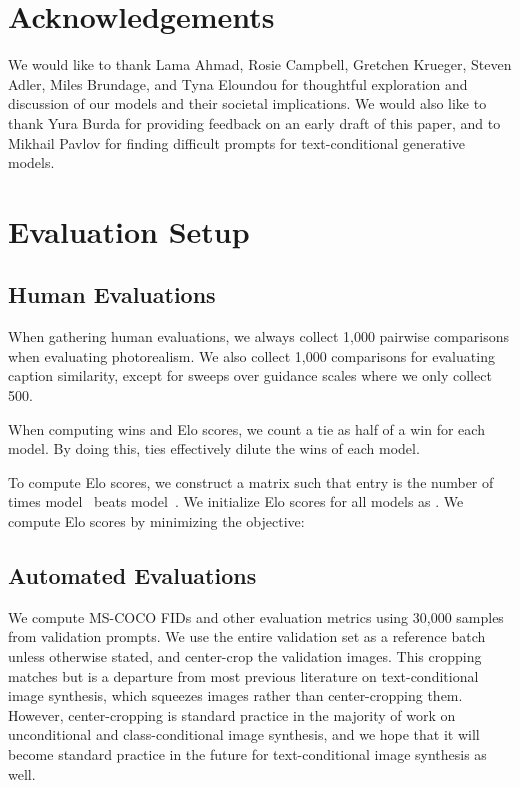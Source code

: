 \documentclass{article}
\begin{document}
\section{Acknowledgements}
\label{sec:acknowledgements}

We would like to thank Lama Ahmad, Rosie Campbell, Gretchen Krueger, Steven Adler, Miles Brundage, and Tyna Eloundou for thoughtful exploration and discussion of our models and their societal implications. We would also like to thank Yura Burda for providing feedback on an early draft of this paper, and to Mikhail Pavlov for finding difficult prompts for text-conditional generative models.





\clearpage

\appendix

\section{Evaluation Setup}

\subsection{Human Evaluations}
\label{app:human_evals}

When gathering human evaluations, we always collect 1,000 pairwise comparisons when evaluating photorealism. We also collect 1,000 comparisons for evaluating caption similarity, except for sweeps over guidance scales where we only collect 500.

When computing wins and Elo scores, we count a tie as half of a win for each model. By doing this, ties effectively dilute the wins of each model.

To compute Elo scores, we construct a matrix  such that entry  is the number of times model~ beats model~. We initialize Elo scores for all  models as . We compute Elo scores by minimizing the objective:


\subsection{Automated Evaluations}

We compute MS-COCO FIDs and other evaluation metrics using 30,000 samples from validation prompts. We use the entire validation set as a reference batch unless otherwise stated, and center-crop the validation images. This cropping matches \citet{dalle} but is a departure from most previous literature on text-conditional image synthesis, which squeezes images rather than center-cropping them. However, center-cropping is standard practice in the majority of work on unconditional and class-conditional image synthesis, and we hope that it will become standard practice in the future for text-conditional image synthesis as well.
\end{document}
